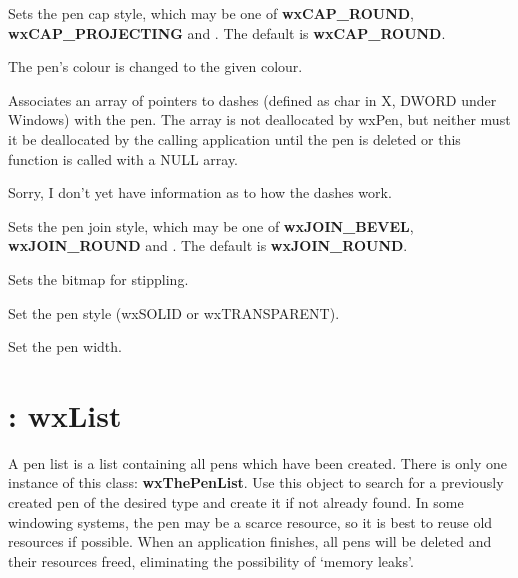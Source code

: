 Sets the pen cap style, which may be one of {\bf wxCAP\_ROUND}, {\bf wxCAP\_PROJECTING} and
. The default is {\bf wxCAP\_ROUND}.





The pen's colour is changed to the given colour.



Associates an array of pointers to dashes (defined as char in X, DWORD under Windows)
with the pen. The array is not deallocated by wxPen, but neither must it be
deallocated by the calling application until the pen is deleted or this
function is called with a NULL array.

Sorry, I don't yet have information as to how the dashes work.



Sets the pen join style, which may be one of {\bf wxJOIN\_BEVEL}, {\bf wxJOIN\_ROUND} and
. The default is {\bf wxJOIN\_ROUND}.



Sets the bitmap for stippling.



Set the pen style (wxSOLID or wxTRANSPARENT).



Set the pen width.

\section{: wxList}\label{wxpenlist}

A pen list is a list containing all pens which have been created. There
is only one instance of this class: {\bf wxThePenList}.  Use this object to search
for a previously created pen of the desired type and create it if not already found.
In some windowing systems, the pen may be a scarce resource, so it is best to
reuse old resources if possible.  When an application finishes, all pens will be
deleted and their resources freed, eliminating the possibility of `memory leaks'.

